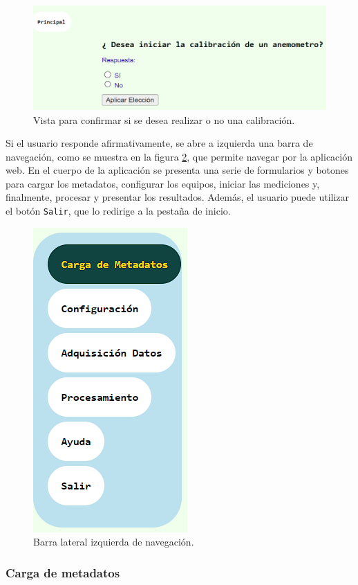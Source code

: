 \begin{figure}[H]
    \centering
    \includegraphics[width=0.7\linewidth]{Figuras/AplicacionWeb/frondend/iniciarCalibViento.png}
    \caption{Vista para confirmar si se desea realizar o no una calibración.}
    \label{fig:iniciarCalibViento}
\end{figure}
Si el usuario responde afirmativamente, se abre a izquierda una barra de navegación, como se muestra en la figura \ref{fig:barraNavegIzq}, que permite navegar por la aplicación web. En el cuerpo de la aplicación se presenta una serie de formularios y botones para cargar los metadatos, configurar los equipos, iniciar las mediciones y, finalmente, procesar y presentar los resultados. Además, el usuario puede utilizar el botón \texttt{Salir}, que lo redirige a la pestaña de inicio.

\begin{figure}[H]
    \centering
    \includegraphics[width=0.2\linewidth]{Figuras/AplicacionWeb/frondend/barraNavegIzq.png}
    \caption{Barra lateral izquierda de navegación.}
    \label{fig:barraNavegIzq}
\end{figure}
\subsubsection{Carga de metadatos}\label{sec:cargaMetadatos}


